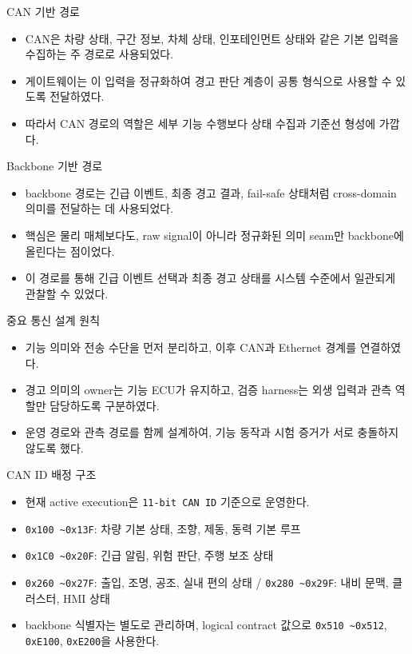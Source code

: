 \documentclass[aspectratio=169,10pt]{beamer}
\begin{document}
\begin{frame}{CAN 기반 경로}
\begin{itemize}
  \item CAN은 차량 상태, 구간 정보, 차체 상태, 인포테인먼트 상태와 같은 기본 입력을 수집하는 주 경로로 사용되었다.
  \item 게이트웨이는 이 입력을 정규화하여 경고 판단 계층이 공통 형식으로 사용할 수 있도록 전달하였다.
  \item 따라서 CAN 경로의 역할은 세부 기능 수행보다 상태 수집과 기준선 형성에 가깝다.
\end{itemize}
\end{frame}

\begin{frame}{Backbone 기반 경로}
\begin{itemize}
  \item backbone 경로는 긴급 이벤트, 최종 경고 결과, fail-safe 상태처럼 cross-domain 의미를 전달하는 데 사용되었다.
  \item 핵심은 물리 매체보다도, raw signal이 아니라 정규화된 의미 seam만 backbone에 올린다는 점이었다.
  \item 이 경로를 통해 긴급 이벤트 선택과 최종 경고 상태를 시스템 수준에서 일관되게 관찰할 수 있었다.
\end{itemize}
\end{frame}

\begin{frame}{중요 통신 설계 원칙}
\begin{itemize}
  \item 기능 의미와 전송 수단을 먼저 분리하고, 이후 CAN과 Ethernet 경계를 연결하였다.
  \item 경고 의미의 owner는 기능 ECU가 유지하고, 검증 harness는 외생 입력과 관측 역할만 담당하도록 구분하였다.
  \item 운영 경로와 관측 경로를 함께 설계하여, 기능 동작과 시험 증거가 서로 충돌하지 않도록 했다.
\end{itemize}
\end{frame}

\begin{frame}{CAN ID 배정 구조}
\begin{itemize}
  \item 현재 active execution은 \texttt{11-bit CAN ID} 기준으로 운영한다.
  \item \texttt{0x100 \textasciitilde 0x13F}: 차량 기본 상태, 조향, 제동, 동력 기본 루프
  \item \texttt{0x1C0 \textasciitilde 0x20F}: 긴급 알림, 위험 판단, 주행 보조 상태
  \item \texttt{0x260 \textasciitilde 0x27F}: 출입, 조명, 공조, 실내 편의 상태 / \texttt{0x280 \textasciitilde 0x29F}: 내비 문맥, 클러스터, HMI 상태
  \item backbone 식별자는 별도로 관리하며, logical contract 값으로 \texttt{0x510 \textasciitilde 0x512}, \texttt{0xE100}, \texttt{0xE200}을 사용한다.
\end{itemize}
\end{frame}
\end{document}
